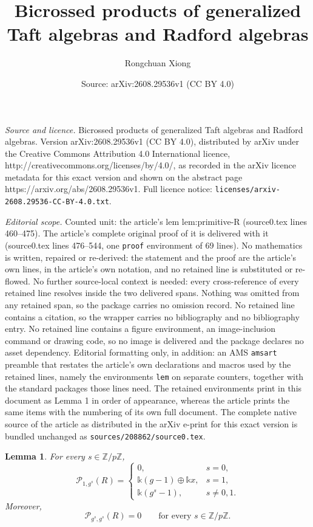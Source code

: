 \documentclass[10pt,a4paper]{amsart}
\title{Bicrossed products of generalized Taft algebras and Radford algebras}
\author{Rongchuan Xiong}
\date{Source: arXiv:2608.29536v1 (CC BY 4.0)}
\newtheorem{lem}{Lemma}
\newcommand{\K}{\mathds{k}}
\newcommand{\Pp}{\mathcal{P}}
\newcommand{\Z}{\mathbb{Z}}
\begin{document}
\maketitle

\noindent\emph{Source and licence.} Bicrossed products of generalized Taft algebras and Radford algebras. Version arXiv:2608.29536v1 (CC BY 4.0), distributed by arXiv under the Creative Commons Attribution 4.0 International licence, http://creativecommons.org/licenses/by/4.0/, as recorded in the arXiv licence metadata for this exact version and shown on the abstract page https://arxiv.org/abs/2608.29536v1. Full licence notice: \texttt{licenses/arxiv-2608.29536-CC-BY-4.0.txt}.\par\smallskip

\noindent\textit{Editorial scope.} Counted unit: the article's lem lem:primitive-R (source0.tex lines 460--475). The article's complete original proof of it is delivered with it (source0.tex lines 476--544, one \texttt{proof} environment of 69 lines). No mathematics is written, repaired or re-derived: the statement and the proof are the article's own lines, in the article's own notation, and no retained line is substituted or re-flowed.  No further source-local context is needed: every cross-reference of every retained line resolves inside the two delivered spans.  Nothing was omitted from any retained span, so the package carries no omission record.  No retained line contains a citation, so the wrapper carries no bibliography and no bibliography entry.  No retained line contains a figure environment, an image-inclusion command or drawing code, so no image is delivered and the package declares no asset dependency.  Editorial formatting only, in addition: an AMS \texttt{amsart} preamble that restates the article's own declarations and macros used by the retained lines, namely the environments \texttt{lem} on separate counters, together with the standard packages those lines need.  The retained environments print in this document as Lemma 1 in order of appearance, whereas the article prints the same items with the numbering of its own full document.  The complete native source of the article as distributed in the arXiv e-print for this exact version is bundled unchanged as \texttt{sources/208862/source0.tex}.
	\begin{lem}\label{lem:primitive-R}
		For every $s\in\Z/p\Z$,
		\[
		\Pp_{1,g^s}(R)=
		\begin{cases}
			0,&s=0,\\
			\K(g-1)\oplus\K x,&s=1,\\
			\K(g^s-1),&s\ne0,1.
		\end{cases}
		\]
		Moreover,
		\[
		\Pp_{g^s,g^s}(R)=0
		\qquad\text{for every }s\in\Z/p\Z.
		\]
	\end{lem}
\end{document}
